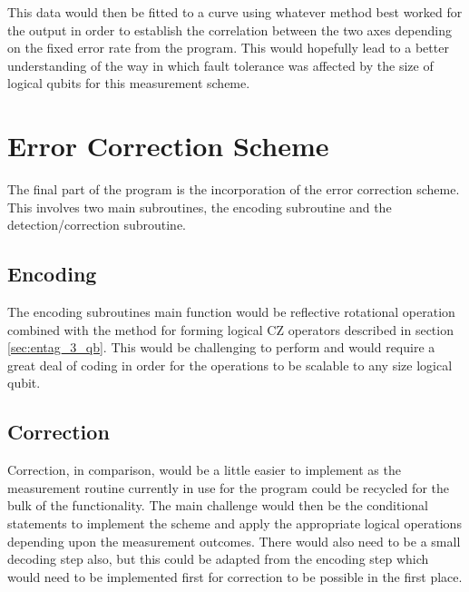 This data would then be fitted to a curve using whatever method best worked for the output in order to establish the correlation between the two axes depending on the fixed error rate from the program. This would hopefully lead to a better understanding of the way in which fault tolerance was affected by the size of logical qubits for this measurement scheme.


\section{Error Correction Scheme}

The final part of the program is the incorporation of the error correction scheme. This involves two main subroutines, the encoding subroutine and the detection/correction subroutine. 


\subsection{Encoding}

The encoding subroutines main function would be reflective rotational operation combined with the method for forming logical CZ operators described in section \ref{sec:entag_3_qb}. This would be challenging to perform and would require a great deal of coding in order for the operations to be scalable to any size logical qubit.


\subsection{Correction}

Correction, in comparison, would be a little easier to implement as the measurement routine currently in use for the program could be recycled for the bulk of the functionality. The main challenge would then be the conditional statements to implement the scheme and apply the appropriate logical operations depending upon the measurement outcomes. There would also need to be a small decoding step also, but this could be adapted from the encoding step which would need to be implemented first for correction to be possible in the first place.


